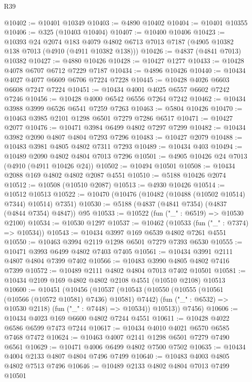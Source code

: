 \begin{lexlean}{R39}
\begin{coremodule}
@10402 := @10401 @10349
@10403 := @4890 @10402
@10404 := @10401 @10355
@10406 := @325 (@10403 @10404)
@10407 := @10400 @10406
@10423 := @10393
    @24
    @2074
    @183
    @4079
    @4802
    @6713
    @7013
    @7187
    (@4905 @10382 @138 @7013 (@4910 (@4911 @10382 @138)))
@10426 := @4837 (@4841 @7013) @10382
@10427 := @4880 @10426
@10428 := @10427 @1277
@10433 := @10428 @4078 @6707 @6712 @7229 @7187
@10434 := @4896 @10426
@10440 := @10434 @4027 @4077 @6609 @6706 @7224 @7228
@10445 := @10428 @4026 @6603 @6608 @7247 @7224
@10451 := @10434 @4001 @4025 @6557 @6602 @7242 @7246
@10456 := @10428 @4000 @6542 @6556 @7264 @7242
@10462 := @10434 @3988 @3999 @6526 @6541 @7259 @7263
@10463 := @5804 @10426
@10470 := @10463 @3985 @2101 @1298 @6501 @7279 @7286 @6517
@10471 := @10427 @2077
@10476 := @10471 @3984 @6499 @4802 @7297 @7299
@10482 := @10434 @3982 @2090 @4807 @4804 @7293 @7296
@10483 := @10427 @2079
@10488 := @10483 @3981 @4805 @4802 @7311 @7293
@10489 := @10434 @403
@10494 := @10489 @2090 @4802 @4804 @7013 @7296
@10501 := @4905 @10426 @24 @7013 (@4910 (@4911 @10426 @24))
@10502 := @10494 @10501
@10508 := @10434 @2088 @169 @4802 @4802 @2087 @4551
@10510 := @5188 @10426 @2074
@10512 := @10508 (@10510 @2087)
@10513 := @4930 @10426
@10514 := @10512 @10513
@10522 := @10470 (@10476 (@10482 (@10488 (@10502 @10514) @7344) @10514) @7351)
@10530 := @5188 (@4837 (@4841 @7354) (@4837 (@4844 @7354) @4847)) @95
@10533 := @10522 (fun ("_" : @6519) => @10530 @2100)
@10534 := @10530 @1297
@10537 := @10462 (@10533 (fun ("_" : @7374) => @10534))
@10543 := @10434 @3997 @169 @6539 @4802 @7261 @4551
@10550 := @10463 @3994 @2119 @1298 @6501 @7279 @7393 @6530
@10555 := @10471 @3993 @6499 @4802 @7403 @7405
@10561 := @10434 @3991 @2111 @4807 @4804 @7399 @7402
@10566 := @10483 @3990 @4805 @4802 @7416 @7399
@10572 := @10489 @2111 @4802 @4804 @7013 @7402 @10501
@10581 := @10434 @2109 @169 @4802 @4802 @2108 @4551 (@10510 @2108) @10513
@10600 := @10451
    (@10456
      (@10537
        (@10543
          (@10550
            (@10555 (@10561 (@10566 (@10572 @10581) @7436) @10581) @7442)
            (fun ("_" : @6532) => @10530 @2118)
            (fun ("_" : @7448) => @10534))
          @10513))
      @7456)
@10606 := @10434 @4023 @169 @6600 @4802 @7244 @4551
@10611 := @10428 @4022 @6586 @6599 @7473 @7244
@10617 := @10434 @4010 @4021 @6570 @6585 @7468 @7472
@10624 := @10463 @4007 @2141 @1298 @6501 @7279 @7490 @6561
@10629 := @10471 @4006 @6499 @4802 @7500 @7502
@10635 := @10434 @4004 @2133 @4807 @4804 @7496 @7499
@10640 := @10483 @4003 @4805 @4802 @7513 @7496
@10646 := @10489 @2133 @4802 @4804 @7013 @7499 @10501

\end{coremodule}
\end{lexlean}
